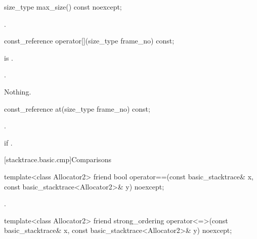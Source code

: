 %
\begin{itemdecl}
size_type max_size() const noexcept;
\end{itemdecl}

\begin{itemdescr}
\pnum
\returns
{}.
\end{itemdescr}

%
\begin{itemdecl}
const_reference operator[](size_type frame_no) const;
\end{itemdecl}

\begin{itemdescr}
\pnum
\hardexpects
{} is .

\pnum
\returns
{}.

\pnum
\throws
Nothing.
\end{itemdescr}

%
\begin{itemdecl}
const_reference at(size_type frame_no) const;
\end{itemdecl}

\begin{itemdescr}
\pnum
\returns
{}.

\pnum
\throws
{} if .
\end{itemdescr}

[stacktrace.basic.cmp]{Comparisons}

%
\begin{itemdecl}
template<class Allocator2>
friend bool operator==(const basic_stacktrace& x, const basic_stacktrace<Allocator2>& y) noexcept;
\end{itemdecl}

\begin{itemdescr}
\pnum
\returns
{}.
\end{itemdescr}

%
\begin{itemdecl}
template<class Allocator2>
friend strong_ordering
  operator<=>(const basic_stacktrace& x, const basic_stacktrace<Allocator2>& y) noexcept;
\end{itemdecl}

